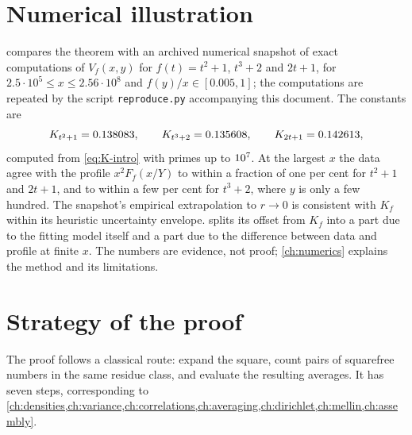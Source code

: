 \section{Numerical illustration}

 compares the theorem with an archived numerical snapshot of exact computations of $V_f(x,y)$ for $f(t)=t^2+1$, $t^3+2$ and $2t+1$, for $2.5\cdot10^5\le x\le 2.56\cdot10^8$ and $f(y)/x\in[0.005,1]$; the computations are repeated by the script \texttt{reproduce.py} accompanying this document. The constants are
\[
K_{t^2+1}=0.138083,\qquad K_{t^3+2}=0.135608,\qquad K_{2t+1}=0.142613,
\]
computed from \eqref{eq:K-intro} with primes up to $10^{7}$. At the largest $x$ the data agree with the profile $x^2F_f(x/Y)$ to within a fraction of one per cent for $t^2+1$ and $2t+1$, and to within a few per cent for $t^3+2$, where $y$ is only a few hundred. The snapshot's empirical extrapolation to $r\to0$ is consistent with $K_f$ within its heuristic uncertainty envelope.  splits its offset from $K_f$ into a part due to the fitting model itself and a part due to the difference between data and profile at finite $x$. The numbers are evidence, not proof; \cref{ch:numerics} explains the method and its limitations.

\section{Strategy of the proof}\label{sec:strategy}

The proof follows a classical route: expand the square, count pairs of squarefree numbers in the same residue class, and evaluate the resulting averages. It has seven steps, corresponding to \cref{ch:densities,ch:variance,ch:correlations,ch:averaging,ch:dirichlet,ch:mellin,ch:assembly}.

